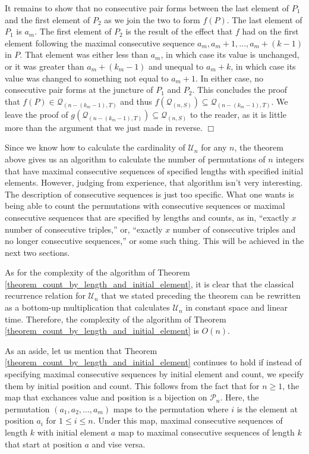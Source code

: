 \documentclass{article}
\def\endproof{\mbox{$\Box$} \par }     %
\begin{document}
It remains to show that no consecutive pair forms between the last element of $P_1$ and the first element of
$P_2$ as we join the two to form $f(P)$. The last element of $P_1$ is $a_m$. The first element of $P_2$ is
the result of the effect that $f$ had on the first element following the maximal consecutive sequence
$a_m, a_m + 1, \ldots, a_m + (k -1)$ in $P$. That element was either less than $a_m$, in which
case its value is unchanged, or it was greater than $a_m + (k_m-1)$ and unequal to $a_m + k$, in which case its value
was changed to something not equal to $a_m + 1$. In either case, no consecutive pair forms at the juncture
of $P_1$ and $P_2$. This concludes the proof that $f(P)\in {\mathcal Q}_{(n-(k_m-1),T)}$ and thus
$f({\mathcal Q}_{(n,S)}) \subseteq {\mathcal Q}_{(n-(k_m-1),T)}$. We leave the proof of
$g({\mathcal Q}_{(n-(k_m-1),T)}) \subseteq {\mathcal Q}_{(n,S)}$ to the reader, as it is little more than
the argument that we just made in reverse.
\endproof

Since we know how to calculate the cardinality of ${\mathcal U}_n$ for any $n$, the theorem above gives
us an algorithm to calculate the number of permutations of $n$ integers that have maximal consecutive
sequences of specified lengths with specified initial elements. However, judging from experience, that algorithm
isn't very interesting. The description of consecutive sequences is just too specific. What one wants
is being able to count the permutations with consecutive sequences or maximal consecutive sequences that
are specified by lengths and counts, as in, ``exactly $x$ number of consecutive triples,'' or, ``exactly
$x$ number of consecutive triples and no longer consecutive sequences,'' or some such thing. This will
be achieved in the next two sections.

As for the complexity of the algorithm of Theorem \ref{theorem_count_by_length_and_initial_element},
it is clear that the classical recurrence relation for ${\mathcal U}_n$ that we stated preceding the
theorem can be rewritten as a bottom-up multiplication that calculates ${\mathcal U}_n$ in constant
space and linear time. Therefore, the complexity of the algorithm of
Theorem \ref{theorem_count_by_length_and_initial_element} is $O(n)$.

As an aside, let us mention that Theorem \ref{theorem_count_by_length_and_initial_element} continues
to hold if instead of specifying maximal consecutive sequences by initial element and count, we specify
them by initial position and count. This follows from the fact that for $n\geq 1$,
the map that exchances value and position is a bijection on ${\mathcal P}_n$. Here, the permutation
$(a_1, a_2, \ldots, a_m)$ maps to the permutation where $i$ is the element at position $a_i$ for $1 \leq i\leq n$. 
Under this map, maximal consecutive sequences of length $k$ with initial element $a$ map to maximal
consecutive sequences of length $k$ that start at position $a$ and vise versa.
\end{document}

